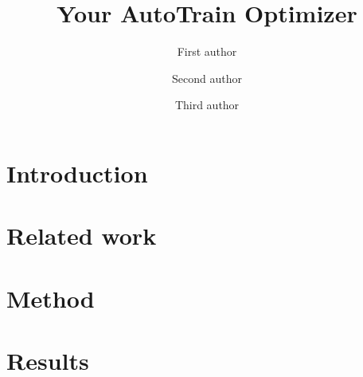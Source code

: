 \documentclass[twocolumn,a4paper,12pt]{article}
\title{Your AutoTrain Optimizer}
\author{
    First author \and
    Second author \and
    Third author
}
\begin{document}
\maketitle


\section{Introduction}

\lipsum[1]


\section{Related work}

\lipsum[2-3]


\section{Method}

\lipsum[4-5]


\section{Results}

\lipsum[6-7]
\end{document}
